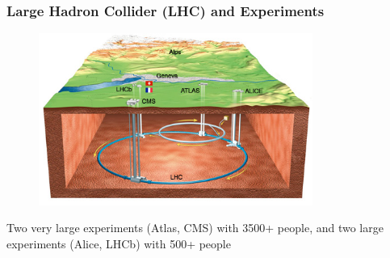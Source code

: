 \begin{frame}
\frametitle{Large Hadron Collider (LHC) and Experiments}

\begin{figure}[htbp]
\begin{center}
\includegraphics[width=0.8\textwidth]{images/CERNMap.jpg}
\end{center}
\end{figure}

\small{Two very large experiments (Atlas, CMS) with 3500+ people, and two large experiments (Alice, LHCb) with 500+ people}

\end{frame}


